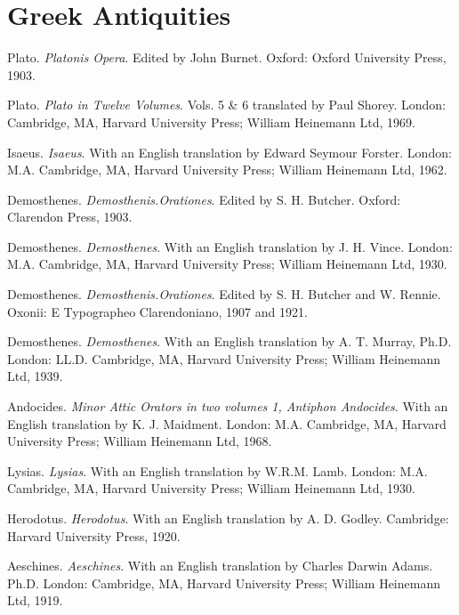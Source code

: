 \documentclass[a4paper,twocolumn,twoside,notitlepage,10pt]{article}
\begin{document}
\section{Greek Antiquities}
\begin{description} %
    \item Plato. \emph{Platonis Opera}. Edited by John Burnet. Oxford: Oxford University Press, 1903.
    \item Plato. \emph{Plato in Twelve Volumes}. Vols. 5 \& 6 translated by Paul Shorey. London: Cambridge, MA, Harvard University Press; William Heinemann Ltd, 1969.

    \item Isaeus. \emph{Isaeus}. With an English translation by Edward Seymour Forster. London: M.A. Cambridge, MA, Harvard University Press; William Heinemann Ltd, 1962.

    \item Demosthenes. \emph{Demosthenis.Orationes}. Edited by S. H. Butcher. Oxford: Clarendon Press, 1903.
    \item Demosthenes. \emph{Demosthenes}. With an English translation by J. H. Vince. London: M.A. Cambridge, MA, Harvard University Press; William Heinemann Ltd, 1930.

    \item Demosthenes. \emph{Demosthenis.Orationes}. Edited by S. H. Butcher and W. Rennie. Oxonii: E Typographeo Clarendoniano, 1907 and 1921.
    \item Demosthenes. \emph{Demosthenes}. With an English translation by A. T. Murray, Ph.D. London: LL.D. Cambridge, MA, Harvard University Press; William Heinemann Ltd, 1939.

    \item Andocides. \emph{Minor Attic Orators in two volumes 1, Antiphon Andocides}. With an English translation by K. J. Maidment. London: M.A. Cambridge, MA, Harvard University Press; William Heinemann Ltd, 1968.
    \item Lysias. \emph{Lysias}. With an English translation by W.R.M. Lamb. London: M.A. Cambridge, MA, Harvard University Press; William Heinemann Ltd, 1930.
\end{description}

\begin{description} %
	\item Herodotus. \emph{Herodotus}. With an English translation by A. D. Godley. Cambridge: Harvard University Press, 1920.
	\item Aeschines. \emph{Aeschines}. With an English translation by Charles Darwin Adams. Ph.D. London: Cambridge, MA, Harvard University Press; William Heinemann Ltd, 1919.
\end{description}
\end{document}
